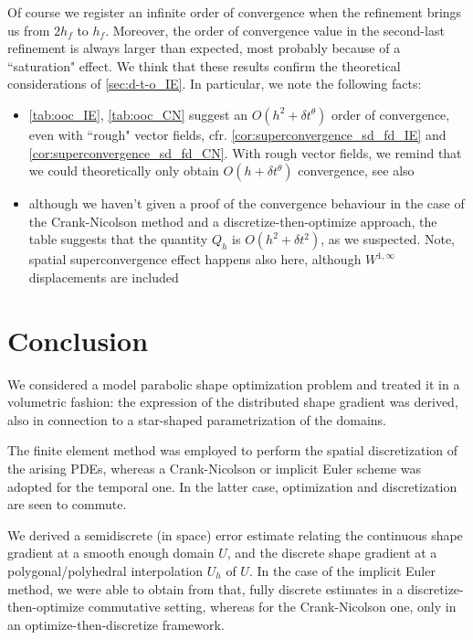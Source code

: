 \documentclass[english,a4paper,9pt,oneside]{scrbook}	%
\theoremstyle{break}
\theoremstyle{remark}
\newcommand{\te}{\theta}
\begin{document}
Of course we register an infinite order of convergence when the refinement brings us from $2h_f$ to $h_f$. Moreover, the order of convergence value in the second-last refinement is always larger than expected, most probably because of a ``saturation" effect. We think that these results confirm the theoretical considerations of \cref{sec:d-t-o_IE}. In particular, we note the following facts:

\begin{itemize}
	\item \cref{tab:ooc_IE}, \cref{tab:ooc_CN} suggest an $O(h^2+\delta t^\te)$ order of convergence, even with ``rough" vector fields, cfr. \cref{cor:superconvergence_sd_fd_IE} and \cref{cor:superconvergence_sd_fd_CN}. With rough vector fields, we remind that we could theoretically only obtain $O(h+\delta t^\te)$ convergence, see also \cite{paganini}
	\item although we haven't given a proof of the convergence behaviour in the case of the Crank-Nicolson method and a discretize-then-optimize approach, the table suggests that the quantity $Q_h$ is $O(h^2+\delta t^2)$, as we suspected. Note, spatial superconvergence effect happens also here, although $W^{1,\infty}$ displacements are included 
\end{itemize}

\chapter{Conclusion}
\label{chap:conclusion}

We considered a model parabolic shape optimization problem and treated it in a volumetric fashion: the expression of the distributed shape gradient was derived, also in connection to a star-shaped parametrization of the domains.

The finite element method was employed to perform the spatial discretization of the arising PDEs, whereas a Crank-Nicolson or implicit Euler scheme was adopted for the temporal one. In the latter case, optimization and discretization are seen to commute.

We derived a semidiscrete (in space) error estimate relating the continuous shape gradient at a smooth enough domain $U$, and the discrete shape gradient at a polygonal/polyhedral interpolation $U_h$ of $U$. In the case of the implicit Euler method, we were able to obtain from that, fully discrete estimates in a discretize-then-optimize commutative setting, whereas for the Crank-Nicolson one, only in an optimize-then-discretize framework.
\end{document}
